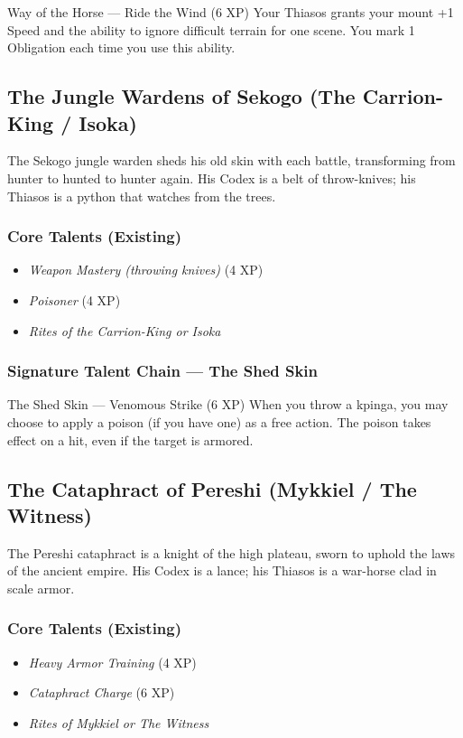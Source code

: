 \documentclass[9pt,a5paper]{extbook}
\begin{document}
\begin{talentbox}{Way of the Horse --- Ride the Wind (6 XP)}
Your Thiasos grants your mount +1 Speed and the ability to ignore difficult terrain for one scene. You mark 1 Obligation each time you use this ability.
\end{talentbox}

\subsection{The Jungle Wardens of Sekogo (The Carrion-King / Isoka)}

The Sekogo jungle warden sheds his old skin with each battle, transforming from hunter to hunted to hunter again. His Codex is a belt of throw-knives; his Thiasos is a python that watches from the trees.

\subsubsection{Core Talents (Existing)}
\begin{itemize}
    \item \textit{Weapon Mastery (throwing knives)} (4 XP)
    \item \textit{Poisoner} (4 XP)
    \item \textit{Rites of the Carrion-King or Isoka}
\end{itemize}

\subsubsection{Signature Talent Chain --- The Shed Skin}

\begin{talentbox}{The Shed Skin --- Venomous Strike (6 XP)}
When you throw a kpinga, you may choose to apply a poison (if you have one) as a free action. The poison takes effect on a hit, even if the target is armored.
\end{talentbox}

\subsection{The Cataphract of Pereshi (Mykkiel / The Witness)}

The Pereshi cataphract is a knight of the high plateau, sworn to uphold the laws of the ancient empire. His Codex is a lance; his Thiasos is a war-horse clad in scale armor.

\subsubsection{Core Talents (Existing)}
\begin{itemize}
    \item \textit{Heavy Armor Training} (4 XP)
    \item \textit{Cataphract Charge} (6 XP)
    \item \textit{Rites of Mykkiel or The Witness}
\end{itemize}
\end{document}
